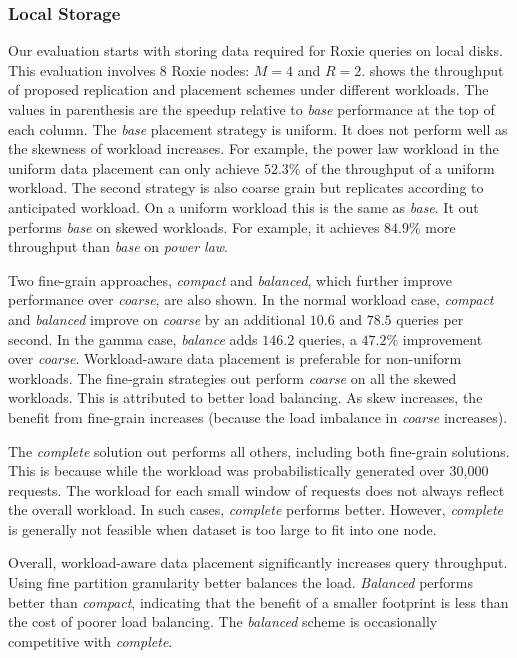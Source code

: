 \subsubsection{Local Storage}

Our evaluation starts with storing data required for Roxie queries
on local disks.
This evaluation involves 8 Roxie nodes: $M=4$ and $R=2$.
\mytable{\ref{tab:throughput_comparison_local}} shows the throughput
of proposed replication and placement schemes under
different workloads.
The values in parenthesis are the speedup relative to \emph{base} performance at
the top of each column.
The \emph{base} placement strategy is uniform.
It does not perform well as
the skewness of workload increases.
For example, the power law workload in the uniform data placement
can only achieve $52.3\%$ of the throughput of a uniform workload.
The second strategy is also coarse grain but replicates according to
anticipated workload.
On a uniform workload this is the same as \emph{base}.
It out performs \emph{base} on skewed workloads.
For example, it
achieves $84.9\%$ more throughput than \emph{base} on \emph{power law}.


Two fine-grain approaches, \emph{compact} and \emph{balanced}, which
further improve performance over \emph{coarse}, are also shown.
In the normal workload case, \emph{compact} and \emph{balanced}
improve on \emph{coarse} by an additional $10.6$ and $78.5$ queries per second.
In the gamma case, \emph{balance} adds $146.2$ queries,
a $47.2\%$ improvement over \emph{coarse}.
Workload-aware data placement is preferable for non-uniform workloads.
The fine-grain strategies out perform \emph{coarse} on all the skewed
workloads.
This is attributed to better load balancing.
As skew increases, the benefit from fine-grain increases (because the
load imbalance in \emph{coarse} increases).




The \emph{complete} solution out performs all others, including both fine-grain
solutions.
This is because while the workload was probabilistically generated
over 30,000 requests.
The workload for each small window of requests does not always reflect
the overall workload.
In such cases, \emph{complete} performs better.
However, \emph{complete} is generally not feasible
when dataset is too large to fit into one node.

Overall, workload-aware data placement significantly increases query throughput.
Using fine partition granularity better balances the load.
\emph{Balanced} performs better than \emph{compact}, indicating that
the benefit of a smaller footprint is less than the cost of poorer load
balancing.
The \emph{balanced} scheme is occasionally competitive with \emph{complete}.

